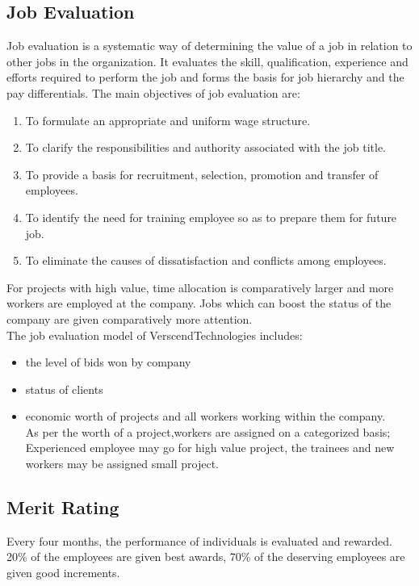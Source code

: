 \subsection{Job Evaluation}
Job evaluation is a systematic way of determining the value of a job in relation to other jobs in the organization.
It evaluates the skill, qualification, experience and efforts required to perform the job and forms the basis for
job hierarchy and the pay differentials.
The main objectives of job evaluation are:
\begin{enumerate}
\item  To formulate an appropriate and uniform wage structure.
\item  To clarify the responsibilities and authority associated with the job title.
\item  To provide a basis for recruitment, selection, promotion and transfer of employees.
\item  To identify the need for training employee so as to prepare them for future job.
\item  To eliminate the causes of dissatisfaction and conflicts among employees.
\end{enumerate}
For projects with high value, time allocation is comparatively larger and more workers are employed at the
company. Jobs which can boost the status of the company are given comparatively more attention.\\
The job evaluation model of VerscendTechnologies includes:
\begin{itemize}
	\item the level of bids won by company
	\item status of clients 
	\item economic worth of projects and all workers working within the company.\\
As per the worth of a project,workers are assigned on a categorized basis; Experienced employee may go for high value project, the trainees
and new workers may be assigned small project.
\end{itemize}
\subsection{Merit Rating}
Every four months, the performance of individuals is evaluated and rewarded. 20\% of the employees are given
best awards, 70\% of the deserving employees are given good increments.
